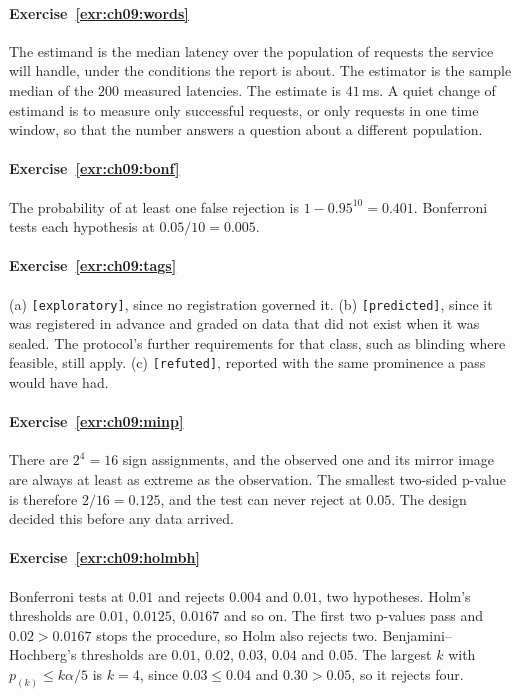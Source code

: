 
\paragraph{Exercise~\ref{exr:ch09:words}}
The estimand is the median latency over the population of requests the service will handle, under the conditions the report is about. The estimator is the sample median of the $200$ measured latencies. The estimate is $41$\,ms. A quiet change of estimand is to measure only successful requests, or only requests in one time window, so that the number answers a question about a different population.

\paragraph{Exercise~\ref{exr:ch09:bonf}}
The probability of at least one false rejection is $1-0.95^{10}=0.401$. Bonferroni tests each hypothesis at $0.05/10=0.005$.

\paragraph{Exercise~\ref{exr:ch09:tags}}
(a) \texttt{[exploratory]}, since no registration governed it. (b) \texttt{[predicted]}, since it was registered in advance and graded on data that did not exist when it was sealed. The protocol's further requirements for that class, such as blinding where feasible, still apply. (c) \texttt{[refuted]}, reported with the same prominence a pass would have had.

\paragraph{Exercise~\ref{exr:ch09:minp}}
There are $2^4=16$ sign assignments, and the observed one and its mirror image are always at least as extreme as the observation. The smallest two-sided p-value is therefore $2/16=0.125$, and the test can never reject at $0.05$. The design decided this before any data arrived.

\paragraph{Exercise~\ref{exr:ch09:holmbh}}
Bonferroni tests at $0.01$ and rejects $0.004$ and $0.01$, two hypotheses. Holm's thresholds are $0.01$, $0.0125$, $0.0167$ and so on. The first two p-values pass and $0.02>0.0167$ stops the procedure, so Holm also rejects two. Benjamini--Hochberg's thresholds are $0.01$, $0.02$, $0.03$, $0.04$ and $0.05$. The largest $k$ with $p_{(k)}\le k\alpha/5$ is $k=4$, since $0.03\le0.04$ and $0.30>0.05$, so it rejects four.

